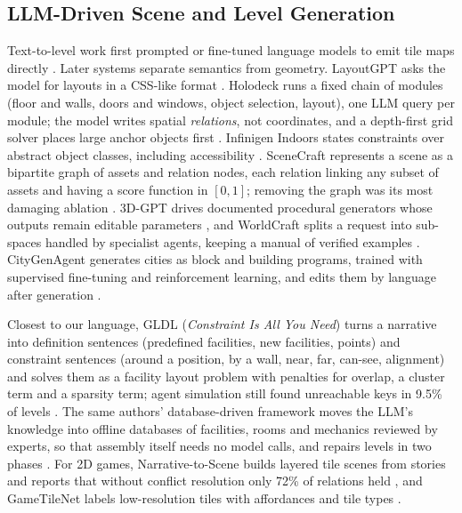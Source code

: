 \documentclass[conference]{IEEEtran}
\begin{document}
\subsection{LLM-Driven Scene and Level Generation}
Text-to-level work first prompted or fine-tuned language models to emit tile maps
directly \cite{todd2023,sudhakaran2023}. Later systems separate semantics from geometry.
LayoutGPT asks the model for layouts in a CSS-like format \cite{layoutgpt}. Holodeck runs
a fixed chain of modules (floor and walls, doors and windows, object selection, layout),
one LLM query per module; the model writes spatial \emph{relations}, not coordinates, and
a depth-first grid solver places large anchor objects first \cite{holodeck}. Infinigen
Indoors states constraints over abstract object classes, including accessibility
\cite{infinigen}. SceneCraft represents a scene as a bipartite graph of assets and
relation nodes, each relation linking any subset of assets and having a score function
in $[0,1]$; removing the graph was its most damaging ablation \cite{scenecraft}.
3D-GPT drives documented procedural generators whose outputs remain editable parameters
\cite{3dgpt}, and WorldCraft splits a request into sub-spaces handled by specialist
agents, keeping a manual of verified examples \cite{worldcraft}. CityGenAgent generates
cities as block and building programs, trained with supervised fine-tuning and
reinforcement learning, and edits them by language after generation
\cite{citygenagent}.

Closest to our language, GLDL (\emph{Constraint Is All You Need}) turns a narrative into
definition sentences (predefined facilities, new facilities, points) and constraint
sentences (around a position, by a wall, near, far, can-see, alignment) and solves them
as a facility layout problem with penalties for overlap, a cluster term and a sparsity
term; agent simulation still found unreachable keys in 9.5\% of levels \cite{gldl}.
The same authors' database-driven framework moves the LLM's knowledge into
offline databases of facilities, rooms and mechanics reviewed by experts, so that
assembly itself needs no model calls, and repairs levels in two phases
\cite{xu2025database}. For 2D games, Narrative-to-Scene builds layered tile scenes from
stories and reports that without conflict resolution only 72\% of relations held
\cite{chen2025narrative}, and GameTileNet labels low-resolution tiles with affordances
and tile types \cite{gametilenet}.
\end{document}
